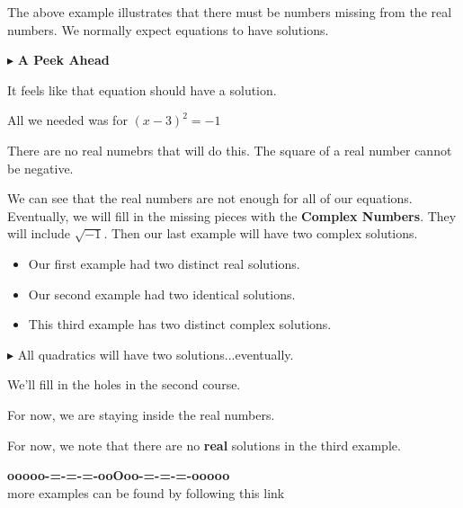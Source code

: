 \documentclass{ximera}
\begin{document}
The above example illustrates that there must be numbers missing from the real numbers.  We normally expect equations to have solutions. 


$\blacktriangleright$  \textbf{\textcolor{purple!85!blue}{A Peek Ahead}} 



It feels like that equation should have a solution.  


All we needed was for $(x-3)^2 = -1$ 

There are no real numebrs that will do this.  The square of a real number cannot be negative. 




We can see that the real numbers are not enough for all of our equations.  Eventually, we will fill in the missing pieces with the \textbf{Complex Numbers}.  They will include $\sqrt{-1}$.  Then our last example will have two complex solutions.  


\begin{itemize}
\item Our first example had two distinct real solutions.  
\item Our second example had two identical solutions.  
\item This third example has two distinct complex solutions. 
\end{itemize}



$\blacktriangleright$ All quadratics will have two solutions...eventually. 

We'll fill in the holes in the second course.









For now, we are staying inside the real numbers.



For now, we note that there are no \textbf{real} solutions in the third example.

























\begin{center}
\textbf{\textcolor{green!50!black}{ooooo-=-=-=-ooOoo-=-=-=-ooooo}} \\

more examples can be found by following this link\\ 

\end{center}
\end{document}

